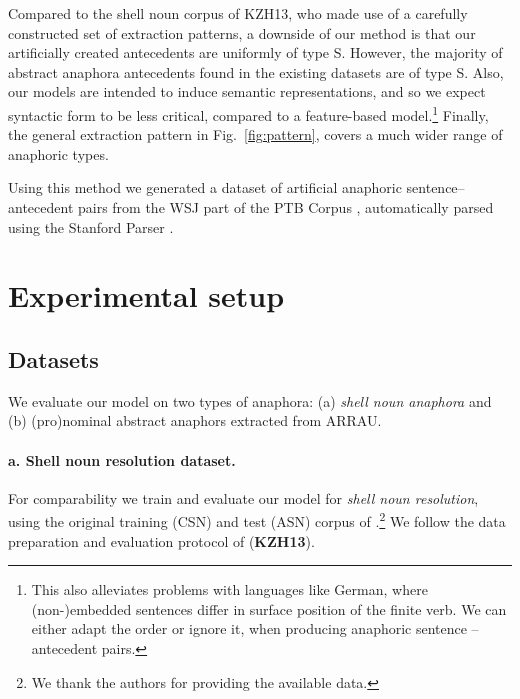 \documentclass[11pt,letterpaper]{article}
\begin{document}
Compared to the shell noun corpus of KZH13, who made use of a carefully constructed set of extraction patterns, a downside of our method is that our artificially created antecedents are uniformly of type S. However, the majority of abstract anaphora antecedents found in the existing datasets are of type S. Also, our models are intended to induce semantic representations, and so we expect syntactic form to be less critical, compared to a feature-based model.\footnote{This also alleviates problems with languages
like German, where (non-)embedded sentences differ in surface position of the finite verb. We can either adapt the order or ignore it, when producing anaphoric sentence -- antecedent pairs.}
Finally,
the general extraction pattern in Fig.\ \ref{fig:pattern},
covers a much wider range of anaphoric types.

Using this method we generated a dataset of artificial anaphoric sentence--antecedent pairs from the WSJ  part of the PTB Corpus \citep{marcus1993building},
automatically parsed using the Stanford Parser \cite{klein2003accurate}. 










 	
	\section{Experimental setup}

\subsection{Datasets}


\noindent
We evaluate our model on two types of anaphora: (a) {\em shell noun anaphora} and (b) (pro)nominal abstract 
anaphors extracted from ARRAU.




\paragraph{a. Shell noun resolution dataset.}\hspace*{-3mm}
For com\-pa\-ra\-bi\-li\-ty we train and evaluate our model for
{\em shell noun resolution}, using the 
original training (CSN) and test (ASN) corpus of \citet{kolhatkar-zinsmeister-hirst:2013:LAW7-ID, kolhatkar-zinsmeister-hirst:2013:EMNLP}.\footnote{We thank the authors for providing the available data.} \hspace*{-0mm} We follow the data preparation and evaluation protocol of  \citet{kolhatkar-zinsmeister-hirst:2013:EMNLP}
({\bf KZH13}). 
\end{document}
